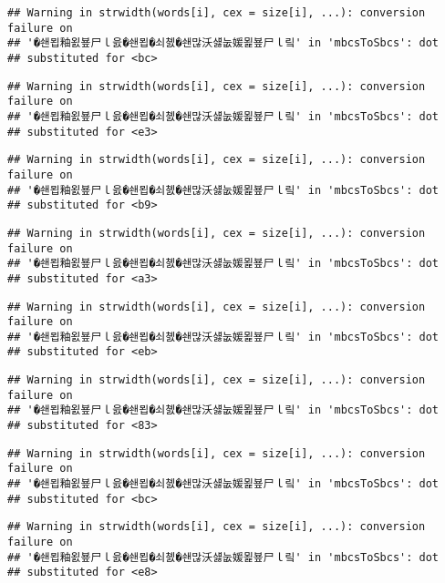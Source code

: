 \documentclass[]{article}
\begin{document}
\begin{verbatim}
## Warning in strwidth(words[i], cex = size[i], ...): conversion failure on
## '�쇈묍釉욄뵾尸ｌ읈�쇈묍�쇠쳸�쇈많沃섏눖媛묉뵾尸ｌ맄' in 'mbcsToSbcs': dot
## substituted for <bc>
\end{verbatim}

\begin{verbatim}
## Warning in strwidth(words[i], cex = size[i], ...): conversion failure on
## '�쇈묍釉욄뵾尸ｌ읈�쇈묍�쇠쳸�쇈많沃섏눖媛묉뵾尸ｌ맄' in 'mbcsToSbcs': dot
## substituted for <e3>
\end{verbatim}

\begin{verbatim}
## Warning in strwidth(words[i], cex = size[i], ...): conversion failure on
## '�쇈묍釉욄뵾尸ｌ읈�쇈묍�쇠쳸�쇈많沃섏눖媛묉뵾尸ｌ맄' in 'mbcsToSbcs': dot
## substituted for <b9>
\end{verbatim}

\begin{verbatim}
## Warning in strwidth(words[i], cex = size[i], ...): conversion failure on
## '�쇈묍釉욄뵾尸ｌ읈�쇈묍�쇠쳸�쇈많沃섏눖媛묉뵾尸ｌ맄' in 'mbcsToSbcs': dot
## substituted for <a3>
\end{verbatim}

\begin{verbatim}
## Warning in strwidth(words[i], cex = size[i], ...): conversion failure on
## '�쇈묍釉욄뵾尸ｌ읈�쇈묍�쇠쳸�쇈많沃섏눖媛묉뵾尸ｌ맄' in 'mbcsToSbcs': dot
## substituted for <eb>
\end{verbatim}

\begin{verbatim}
## Warning in strwidth(words[i], cex = size[i], ...): conversion failure on
## '�쇈묍釉욄뵾尸ｌ읈�쇈묍�쇠쳸�쇈많沃섏눖媛묉뵾尸ｌ맄' in 'mbcsToSbcs': dot
## substituted for <83>
\end{verbatim}

\begin{verbatim}
## Warning in strwidth(words[i], cex = size[i], ...): conversion failure on
## '�쇈묍釉욄뵾尸ｌ읈�쇈묍�쇠쳸�쇈많沃섏눖媛묉뵾尸ｌ맄' in 'mbcsToSbcs': dot
## substituted for <bc>
\end{verbatim}

\begin{verbatim}
## Warning in strwidth(words[i], cex = size[i], ...): conversion failure on
## '�쇈묍釉욄뵾尸ｌ읈�쇈묍�쇠쳸�쇈많沃섏눖媛묉뵾尸ｌ맄' in 'mbcsToSbcs': dot
## substituted for <e8>
\end{verbatim}
\end{document}
